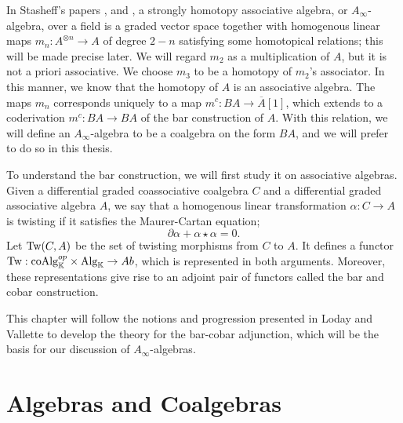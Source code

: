 \documentclass[../thesis.tex]{subfiles}
\begin{document}
        In Stasheff's papers \cite{Stasheff63I}, and \cite{Stasheff63II}, a strongly homotopy associative algebra, or $A_\infty$-algebra, over a field is a graded vector space together with homogenous linear maps $m_n: A^{\otimes n}\rightarrow A$ of degree $2-n$ satisfying some homotopical relations; this will be made precise later. We will regard $m_2$ as a multiplication of $A$, but it is not a priori associative. We choose $m_3$ to be a homotopy of $m_2$'s associator. In this manner, we know that the homotopy of $A$ is an associative algebra. The maps $m_n$ corresponds uniquely to a map $m^c:BA\rightarrow \overline{A}[1]$, which extends to a coderivation $m^c : BA\rightarrow BA$ of the bar construction of $A$. With this relation, we will define an $A_\infty$-algebra to be a coalgebra on the form $BA$, and we will prefer to do so in this thesis.


        To understand the bar construction, we will first study it on associative algebras. Given a differential graded coassociative coalgebra $C$ and a differential graded associative algebra $A$, we say that a homogenous linear transformation $\alpha: C\rightarrow A$ is twisting if it satisfies the Maurer-Cartan equation;
            \begin{equation*}
                \partial\alpha + \alpha\star\alpha = 0.
            \end{equation*}
        Let $\tt{Tw}(C, A)$ be the set of twisting morphisms from $C$ to $A$. It defines a functor $\tt{Tw}: \tt{coAlg}_{\mathbb{K}}^{op}\times \tt{Alg}_{\mathbb{K}} \rightarrow Ab$, which is represented in both arguments. Moreover, these representations give rise to an adjoint pair of functors called the bar and cobar construction.

        \begin{center}
        \end{center}

        This chapter will follow the notions and progression presented in Loday and Vallette \cite{Loday12} to develop the theory for the bar-cobar adjunction, which will be the basis for our discussion of $A_\infty$-algebras.

    \section{Algebras and Coalgebras}    
\end{document}
